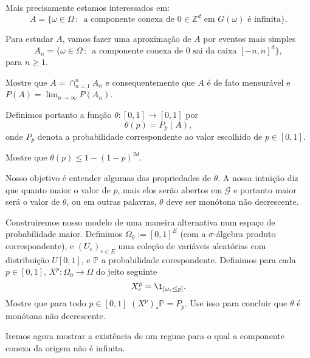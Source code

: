 \begin{topics}
Mais precisamente estamos interessados em:
\begin{equation}
  A = \big\{\omega \in \Omega \, : \,  \text{ a componente conexa de $0 \in \mathbb{Z}^d$ em $G(\omega)$ é infinita} \big\}.
\end{equation}

Para estudar $A$, vamos fazer uma aproximação de $A$ por eventos mais simples
\begin{equation}
  A_n = \big\{ \omega \in \Omega \, : \, \text{ a componente conexa de $0$ sai da caixa $[-n, n]^d$}\},
\end{equation}
para $n \geq 1$.

\begin{exercise}
  Mostre que $A = \cap_{n=1}^n A_n$ e consequentemente que $A$ é de fato mensurável e $P(A) = \lim_{n\to \infty} P(A_n)$.
\end{exercise}

Definimos portanto a função $\theta:[0,1] \to [0,1]$ por
\begin{equation}
  \theta(p) = P_p(A),
\end{equation}
onde $P_p$ denota a probabilidade correspondente ao valor escolhido de $p \in [0,1]$.

\begin{exercise}
  Mostre que $\theta(p) \leq 1-(1-p)^{2d}$.
\end{exercise}

Nosso objetivo é entender algumas das propriedades de $\theta$.
A nossa intuição diz que quanto maior o valor de $p$, mais elos serão abertos em $\mathcal{G}$ e portanto maior será o valor de $\theta$, ou em outras palavras, $\theta$ deve ser monótona não decrescente.

\begin{exercise}
  Construiremos nosso modelo de uma maneira alternativa num espaço de probabilidade maior.
  Definimos $\Omega_0:=[0,1]^E$ (com a $\sigma$-álgebra produto correspondente), e $(U_e)_{e\in E}$
  uma coleção de variáveis aleatórias \iid com distribuição $U[0,1]$, e  $\mathbb{P}$ a probabilidade corespondente.
  Definimos para cada $p \in [0,1]$, $X^p : \Omega_0 \to \Omega$ do jeito seguinte
  \begin{equation}
    X^p_e = \1_{[\omega_e \leq p]}.
  \end{equation}
  Mostre que para todo $p \in [0,1]$  $(X^p)_*\mathbb{P}=P_p$.
  Use isso para concluir que $\theta$ é monótona não decrescente.
\end{exercise}

Iremos agora mostrar a existência de um regime para o qual a componente conexa da origem não é infinita.


\end{topics}
